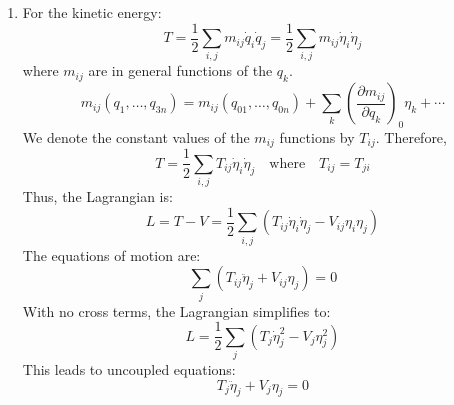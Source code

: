 \documentclass[12pt]{article}
\begin{document}
\begin{enumerate}
		\item For the kinetic energy:
		\[
		T = \frac{1}{2} \sum_{i,j} m_{ij} \dot{q}_i \dot{q}_j = \frac{1}{2} \sum_{i,j} m_{ij} \dot{\eta}_i \dot{\eta}_j
		\]
		where $m_{ij}$ are in general functions of the $q_k$.
		\[
		m_{ij}(q_1, \dots, q_{3n}) = m_{ij}(q_{01}, \dots, q_{0n}) + \sum_k \left(\frac{\partial m_{ij}}{\partial q_k}\right)_0 \eta_k + \cdots
		\]
		We denote the constant values of the $m_{ij}$ functions by $T_{ij}$. Therefore,
		\[
		T = \frac{1}{2} \sum_{i,j} T_{ij} \dot{\eta}_i \dot{\eta}_j \quad \text{where} \quad T_{ij} = T_{ji}
		\]
		Thus, the Lagrangian is:
		\[
		L = T - V = \frac{1}{2} \sum_{i,j} (T_{ij} \dot{\eta}_i \dot{\eta}_j - V_{ij} \eta_i \eta_j)
		\]
		The equations of motion are:
		\[
		\sum_j (T_{ij} \ddot{\eta}_j + V_{ij} \eta_j) = 0
		\]
		With no cross terms, the Lagrangian simplifies to:
		\[
		L = \frac{1}{2} \sum_j (T_j \dot{\eta}_j^2 - V_j \eta_j^2)
		\]
		This leads to uncoupled equations:
		\[
		T_j \ddot{\eta}_j + V_j \eta_j = 0
		\]
	\end{enumerate}
	
\end{document}

